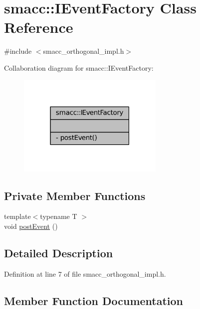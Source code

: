 \hypertarget{classsmacc_1_1IEventFactory}{}\section{smacc\+:\+:I\+Event\+Factory Class Reference}
\label{classsmacc_1_1IEventFactory}


{\ttfamily \#include $<$smacc\+\_\+orthogonal\+\_\+impl.\+h$>$}



Collaboration diagram for smacc\+:\+:I\+Event\+Factory\+:
\nopagebreak
\begin{figure}[H]
\begin{center}
\leavevmode
\includegraphics[width=198pt]{classsmacc_1_1IEventFactory__coll__graph}
\end{center}
\end{figure}
\subsection*{Private Member Functions}
\begin{DoxyCompactItemize}
\item 
{\footnotesize template$<$typename T $>$ }\\void \hyperlink{classsmacc_1_1IEventFactory_ae112bd549c8a99d872417b54f401cf3f}{post\+Event} ()
\end{DoxyCompactItemize}


\subsection{Detailed Description}


Definition at line 7 of file smacc\+\_\+orthogonal\+\_\+impl.\+h.



\subsection{Member Function Documentation}
